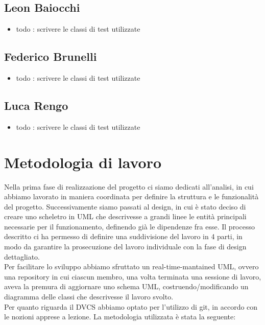 \subsection*{Leon Baiocchi}

\begin{itemize}
	\item todo : scrivere le classi di test utilizzate
\end{itemize}

\subsection*{Federico Brunelli}

\begin{itemize}
	\item todo : scrivere le classi di test utilizzate
\end{itemize}

\subsection*{Luca Rengo}

\begin{itemize}
	\item todo : scrivere le classi di test utilizzate
\end{itemize}



\section{Metodologia di lavoro}

Nella prima fase di realizzazione del progetto ci siamo dedicati all'analisi, in cui abbiamo lavorato in maniera coordinata per definire la struttura e le funzionalità del progetto.
Successivamente siamo passati al design, in cui è stato deciso di creare uno scheletro in UML che descrivesse a grandi linee le entità principali necessarie per il funzionamento, definendo già le dipendenze fra esse. Il processo descritto ci ha permesso di definire una suddivisione del lavoro in 4 parti, in modo da garantire la prosecuzione del lavoro individuale con la fase di design dettagliato. \\
Per facilitare lo sviluppo abbiamo sfruttato un real-time-mantained UML, ovvero una repository in cui ciascun membro, una volta terminata una sessione di lavoro, aveva la premura di aggiornare uno schema UML, costruendo/modificando un diagramma delle classi che descrivesse il lavoro svolto. \\
Per quanto riguarda il DVCS abbiamo optato per l'utilizzo di git, in accordo con le nozioni apprese a lezione. La metodologia utilizzata è stata la seguente:

